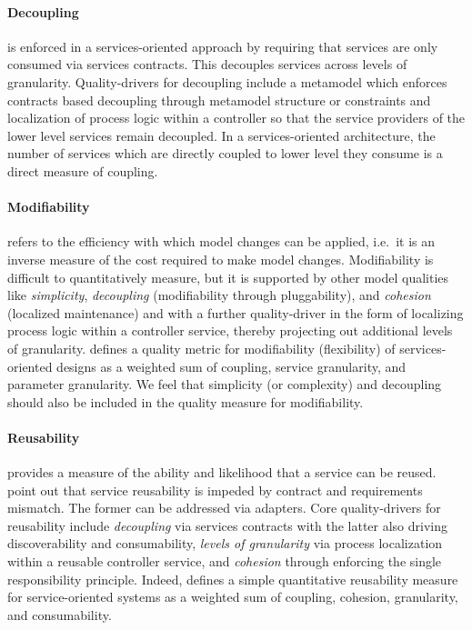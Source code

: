 \paragraph{Decoupling} is enforced in a services-oriented approach by requiring that services are only consumed via services contracts. This decouples services across levels of granularity. Quality-drivers for decoupling include a metamodel which enforces contracts based decoupling through metamodel structure or constraints and localization of process logic within a controller so that the service providers of the lower level services remain decoupled. In a services-oriented architecture, the number of services which are directly coupled to lower level they consume is a direct measure of coupling\cite{shim_design_2008}.

\paragraph{Modifiability} refers to the efficiency with which model changes can be applied, i.e.\ it is an inverse measure of the cost required to make model changes. Modifiability is difficult to quantitatively measure, but it is supported by other model qualities like \emph{simplicity},  \emph{decoupling} (modifiability through pluggability), and \emph{cohesion} (localized maintenance) and with a further quality-driver in the form of localizing process logic within a controller service, thereby projecting out additional levels of granularity. \cite{shim_design_2008} defines a quality metric for modifiability (flexibility) of services-oriented designs as a weighted sum of coupling, service granularity, and parameter granularity. We feel that simplicity (or complexity) and decoupling should also be included in the quality measure for modifiability.

\paragraph{Reusability} provides a measure of the ability and likelihood that a service can be reused.  \cite{khoshkbarforoushha_metric_2010,choi_quality_2008,feuerlicht_determinants_2007}
\cite{khoshkbarforoushha_metric_2010} point out that service reusability is impeded by contract and requirements mismatch. The former can be addressed via adapters. Core quality-drivers for reusability include \emph{decoupling} via services contracts with the latter also driving discoverability and consumability, \emph{levels of granularity} via process localization within a reusable controller service, and \emph{cohesion} through enforcing the single responsibility principle. Indeed, \cite{shim_design_2008} defines a simple quantitative reusability measure for service-oriented systems as a weighted sum of coupling, cohesion, granularity, and consumability.

